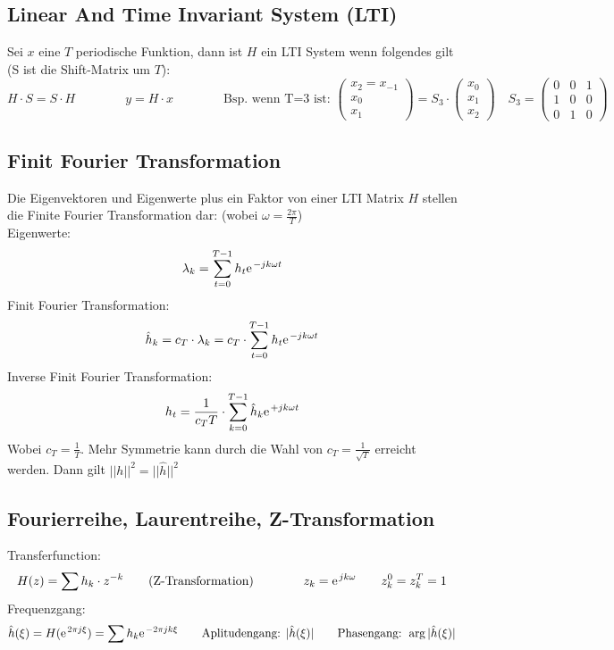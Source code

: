 \subsection{Linear And Time Invariant System (LTI)}
Sei $x$ eine $T$ periodische Funktion, dann ist $H$ ein LTI System wenn folgendes gilt (S ist die Shift-Matrix um $T$):
\[ 	H\cdot S = S\cdot H \qquad \qquad y=H\cdot x 
	\qquad \qquad 
	\text{Bsp. wenn T=3 ist: } \left( \begin{array}{ccc} x_2=x_{-1} \\ x_0 \\ x_1 \end{array} \right) = S_3 \cdot \left( \begin{array}{ccc} x_0 \\ x_1 \\ x_2 \end{array} \right) \quad
	S_3=
	\left( \begin{array}{ccc}
	0 & 0 & 1 \\
	1 & 0 & 0 \\
	0 & 1 & 0 
	\end{array} \right) 
\]


\subsection{Finit Fourier Transformation}
Die Eigenvektoren und Eigenwerte plus ein Faktor von einer LTI Matrix $H$ stellen die Finite Fourier Transformation dar: (wobei $\omega = \frac{2\pi}{T}$)\\

Eigenwerte: \[ \lambda_k = \sum_{t=0}^{T-1} h_t \e^{-jk\omega t} \]
Finit Fourier Transformation: \[ \hat{h}_k = c_T \cdot \lambda_k = c_T \cdot \sum_{t=0}^{T-1} h_t \e^{-jk\omega t} \]
Inverse Finit Fourier Transformation: \[ h_t = \frac{1}{c_T T} \cdot \sum_{k=0}^{T-1}\hat{h}_k \e^{+jk\omega t} \]
Wobei $c_T = \frac{1}{T}$. Mehr Symmetrie kann durch die Wahl von $c_T = \frac{1}{\sqrt{T}}$ erreicht werden. Dann gilt $||h||^2=||\hat{h}||^2$


\subsection{Fourierreihe, Laurentreihe, Z-Transformation}

Transferfunction: \[ H(z)=\sum h_k \cdot z^{-k} \qquad \text{(Z-Transformation)} \qquad \qquad z_k=\e^{jk\omega} \qquad z_k^0=z_k^T=1 \]
Frequenzgang: \[ \hat{h}(\xi) = H(\e^{2\pi j \xi})=\sum h_k \e^{-2\pi jk \xi} \qquad \text{Aplitudengang: } |\hat{h}(\xi)| \qquad \text{Phasengang: } \arg|\hat{h}(\xi)| \]

